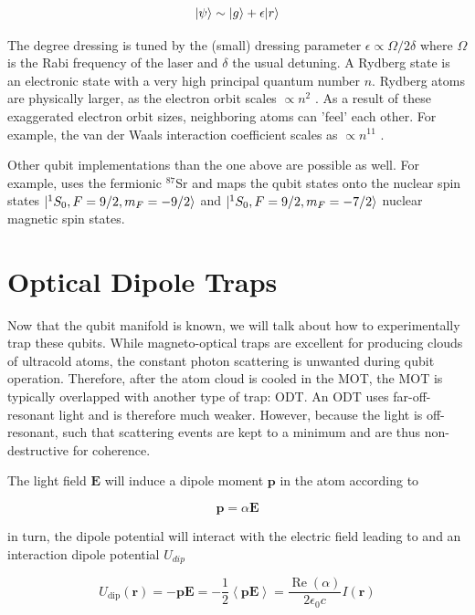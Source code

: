 \begin{equation}\label{eq:RydbergDressing}
	\lvert\psi\rangle \sim \lvert g\rangle + \epsilon \lvert r\rangle
\end{equation}

The degree dressing is tuned by the (small) dressing parameter $\epsilon \propto \Omega / 2\delta$ where $\Omega$ is the Rabi frequency of the laser and $\delta$ the usual detuning. A Rydberg state is an electronic state with a very high principal quantum number $n$. Rydberg atoms are physically larger, as the electron orbit scales $\propto n^2$ \cite{Gallagher1994}. As a result of these exaggerated electron orbit sizes, neighboring atoms can 'feel' each other. For example, the van der Waals interaction coefficient scales as $\propto n^{11}$ \cite{Gallagher1994}. 

Other qubit implementations than the one above are possible as well. For example, \cite{Barnes2021} uses the fermionic ${}^{87}$Sr and maps the qubit states onto the nuclear spin states $\lvert{}^1S_0, F=9/2, m_F = -9/2\rangle$ and $\lvert{}^1S_0, F=9/2, m_F = -7/2\rangle$ nuclear magnetic spin states. 


\section{Optical Dipole Traps}\label{sec:OpticalDipoleTrap}

Now that the qubit manifold is known, we will talk about how to experimentally trap these qubits. While magneto-optical traps are excellent for producing clouds of ultracold atoms, the constant photon scattering is unwanted during qubit operation. Therefore, after the atom cloud is cooled in the \ac{MOT}, the MOT is typically overlapped with another type of trap: \ac{ODT}. An ODT uses far-off-resonant light and is therefore much weaker. However, because the light is off-resonant, such that scattering events are kept to a minimum and are thus non-destructive for coherence. 

The light field $\mathbf{E}$ will induce a dipole moment $\mathbf{p}$ in the atom according to 
	
\begin{equation}\label{eq:DipoleMoment}
	\mathbf{p} = \alpha \mathbf{E}
\end{equation}

in turn, the dipole potential will interact with the electric field leading to and an interaction dipole potential $U_{dip}$

\begin{equation}\label{eq:DipolePotential}
	U_{\text{dip}}(\mathbf{r}) = -\mathbf{p}\mathbf{E} = 
	-\frac{1}{2} \left\langle \mathbf{p}\mathbf{E} \right\rangle = \frac{\operatorname{Re}(\alpha)}{2\epsilon_0 c} I(\mathbf{r})
\end{equation}

